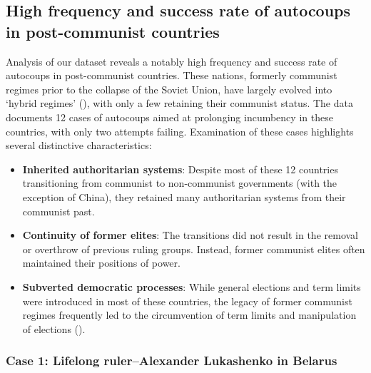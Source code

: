 \documentclass[
  12pt,
]{report}
\begin{document}
\subsection{High frequency and success rate of autocoups in
post-communist
countries}\label{high-frequency-and-success-rate-of-autocoups-in-post-communist-countries}

Analysis of our dataset reveals a notably high frequency and success
rate of autocoups in post-communist countries. These nations, formerly
communist regimes prior to the collapse of the Soviet Union, have
largely evolved into `hybrid regimes'
(), with only a
few retaining their communist status. The data documents 12 cases of
autocoups aimed at prolonging incumbency in these countries, with only
two attempts failing. Examination of these cases highlights several
distinctive characteristics:

\begin{itemize}
\item
  \textbf{Inherited authoritarian systems}: Despite most of these 12
  countries transitioning from communist to non-communist governments
  (with the exception of China), they retained many authoritarian
  systems from their communist past.
\item
  \textbf{Continuity of former elites}: The transitions did not result
  in the removal or overthrow of previous ruling groups. Instead, former
  communist elites often maintained their positions of power.
\item
  \textbf{Subverted democratic processes}: While general elections and
  term limits were introduced in most of these countries, the legacy of
  former communist regimes frequently led to the circumvention of term
  limits and manipulation of elections
  ().
\end{itemize}

\subsubsection*{Case 1: Lifelong ruler--Alexander Lukashenko in
Belarus}\label{case-1-lifelong-ruleralexander-lukashenko-in-belarus}
\end{document}
